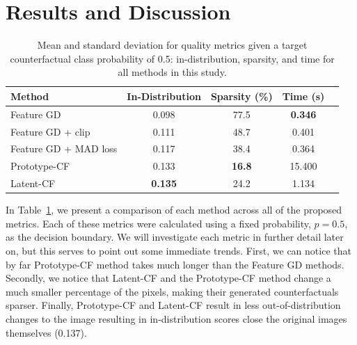 \documentclass[letterpaper]{article} %
\begin{document}
\section{Results and Discussion}
\begin{table}[ht]
\centering
\begin{tabular}{l|c|c|c|c}
\textbf{Method}         & \textbf{In-Distribution}  & \textbf{Sparsity (\%) } & \textbf{Time (s)} \\ \hline
Feature GD                  & 0.098         &  77.5     &      \textbf{0.346}        \\ \hline
Feature GD + clip           & 0.111        &  48.7      &      0.401         \\ \hline
Feature GD + MAD loss       & 0.117        &  38.4      &      0.364        \\ \hline
Prototype-CF                & 0.133  &  \textbf{16.8} &      15.400         \\ \hline
Latent-CF           & \textbf{0.135} &      24.2&      1.134  
\end{tabular}
\caption{Mean and standard deviation for quality metrics given a target counterfactual class probability of 0.5: in-distribution, sparsity, and time for all methods in this study. }
\label{tab:comparison}
\end{table}

In Table~\ref{tab:comparison}, we present a comparison of each method across all of the proposed metrics. Each of these metrics were calculated using a fixed probability, $p = 0.5$,   as the decision boundary. We will investigate each metric in further detail later on, but this serves to point out some immediate trends. First, we can notice that by far Prototype-CF method takes much longer than the Feature GD methods. Secondly, we notice that Latent-CF and the Prototype-CF method change a much smaller percentage of the pixels, making their generated counterfactuals sparser. Finally, Prototype-CF and Latent-CF result in less out-of-distribution changes to the image resulting in in-distribution scores close the original images themselves (0.137).
\end{document}
